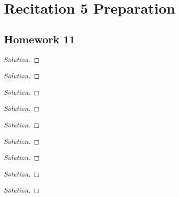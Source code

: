 \chapter{Recitation 5 Preparation}
\section{Homework 11}
\begin{problem}
\end{problem}
\begin{proof}[Solution]
\end{proof}

\begin{problem}
\end{problem}
\begin{proof}[Solution]
\end{proof}

\begin{problem}
\end{problem}
\begin{proof}[Solution]
\end{proof}

\begin{problem}
\end{problem}
\begin{proof}[Solution]
\end{proof}

\begin{problem}
\end{problem}
\begin{proof}[Solution]
\end{proof}

\begin{problem}
\end{problem}
\begin{proof}[Solution]
\end{proof}

\begin{problem}
\end{problem}
\begin{proof}[Solution]
\end{proof}

\begin{problem}
\end{problem}
\begin{proof}[Solution]
\end{proof}

\begin{problem}
\end{problem}
\begin{proof}[Solution]
\end{proof}

